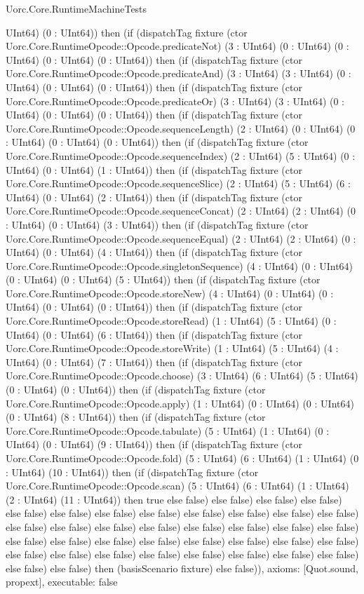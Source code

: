 \begin{lexlean}{Uorc.Core.RuntimeMachineTests}
\begin{semanticmodule}
{UInt64) (0 : UInt64)) then (if (dispatchTag fixture (ctor Uorc.Core.RuntimeOpcode::Opcode.predicateNot) (3 : UInt64) (0 : UInt64) (0 : UInt64) (0 : UInt64) (0 : UInt64)) then (if (dispatchTag fixture (ctor Uorc.Core.RuntimeOpcode::Opcode.predicateAnd) (3 : UInt64) (3 : UInt64) (0 : UInt64) (0 : UInt64) (0 : UInt64)) then (if (dispatchTag fixture (ctor Uorc.Core.RuntimeOpcode::Opcode.predicateOr) (3 : UInt64) (3 : UInt64) (0 : UInt64) (0 : UInt64) (0 : UInt64)) then (if (dispatchTag fixture (ctor Uorc.Core.RuntimeOpcode::Opcode.sequenceLength) (2 : UInt64) (0 : UInt64) (0 : UInt64) (0 : UInt64) (0 : UInt64)) then (if (dispatchTag fixture (ctor Uorc.Core.RuntimeOpcode::Opcode.sequenceIndex) (2 : UInt64) (5 : UInt64) (0 : UInt64) (0 : UInt64) (1 : UInt64)) then (if (dispatchTag fixture (ctor Uorc.Core.RuntimeOpcode::Opcode.sequenceSlice) (2 : UInt64) (5 : UInt64) (6 : UInt64) (0 : UInt64) (2 : UInt64)) then (if (dispatchTag fixture (ctor Uorc.Core.RuntimeOpcode::Opcode.sequenceConcat) (2 : UInt64) (2 : UInt64) (0 : UInt64) (0 : UInt64) (3 : UInt64)) then (if (dispatchTag fixture (ctor Uorc.Core.RuntimeOpcode::Opcode.sequenceEqual) (2 : UInt64) (2 : UInt64) (0 : UInt64) (0 : UInt64) (4 : UInt64)) then (if (dispatchTag fixture (ctor Uorc.Core.RuntimeOpcode::Opcode.singletonSequence) (4 : UInt64) (0 : UInt64) (0 : UInt64) (0 : UInt64) (5 : UInt64)) then (if (dispatchTag fixture (ctor Uorc.Core.RuntimeOpcode::Opcode.storeNew) (4 : UInt64) (0 : UInt64) (0 : UInt64) (0 : UInt64) (0 : UInt64)) then (if (dispatchTag fixture (ctor Uorc.Core.RuntimeOpcode::Opcode.storeRead) (1 : UInt64) (5 : UInt64) (0 : UInt64) (0 : UInt64) (6 : UInt64)) then (if (dispatchTag fixture (ctor Uorc.Core.RuntimeOpcode::Opcode.storeWrite) (1 : UInt64) (5 : UInt64) (4 : UInt64) (0 : UInt64) (7 : UInt64)) then (if (dispatchTag fixture (ctor Uorc.Core.RuntimeOpcode::Opcode.choose) (3 : UInt64) (6 : UInt64) (5 : UInt64) (0 : UInt64) (0 : UInt64)) then (if (dispatchTag fixture (ctor Uorc.Core.RuntimeOpcode::Opcode.apply) (1 : UInt64) (0 : UInt64) (0 : UInt64) (0 : UInt64) (8 : UInt64)) then (if (dispatchTag fixture (ctor Uorc.Core.RuntimeOpcode::Opcode.tabulate) (5 : UInt64) (1 : UInt64) (0 : UInt64) (0 : UInt64) (9 : UInt64)) then (if (dispatchTag fixture (ctor Uorc.Core.RuntimeOpcode::Opcode.fold) (5 : UInt64) (6 : UInt64) (1 : UInt64) (0 : UInt64) (10 : UInt64)) then (if (dispatchTag fixture (ctor Uorc.Core.RuntimeOpcode::Opcode.scan) (5 : UInt64) (6 : UInt64) (1 : UInt64) (2 : UInt64) (11 : UInt64)) then true else false) else false) else false) else false) else false) else false) else false) else false) else false) else false) else false) else false) else false) else false) else false) else false) else false) else false) else false) else false) else false) else false) else false) else false) else false) else false) else false) else false) else false) else false) else false) else false) else false) else false) else false) else false) else false) else false) then (basisScenario fixture) else false)),
  axioms: [Quot.sound, propext],
  executable: false
}


\end{semanticmodule}
\end{lexlean}
